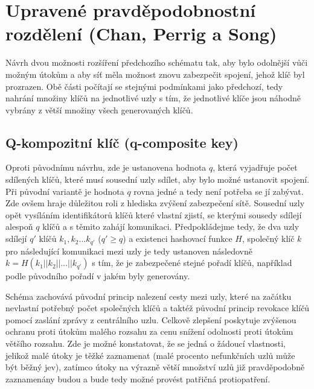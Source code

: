 \documentclass[11pt,final,twoside]{fithesis2}
\begin{document}
\section{Upravené pravděpodobnostní rozdělení (Chan, Perrig a Song)} \label{sec:Chan}
Návrh dvou možnosti rozšíření \cite{Perrig2003} předchozího schématu \cite{Eschenauer2002} tak, aby bylo odolnější vůči možným útokům a aby síť měla možnost znovu zabezpečit spojení, jehož
klíč byl prozrazen. Obě části počítají se stejnými podmínkami jako předchozí, tedy nahrání množiny klíčů na jednotlivé uzly s tím, že jednotlivé klíče jsou náhodně vybrány 
z větší množiny všech generovaných klíčů.

\subsection{Q-kompozitní klíč (q-composite key)}
Oproti původnímu návrhu, zde je ustanovena hodnota $q$, která vyjadřuje počet sdílených klíčů, které musí sousední uzly sdílet, aby bylo možné ustanovit spojení. Při původní variantě 
je hodnota $q$ rovna jedné a tedy není potřeba se jí zabývat. Zde ovšem hraje důležitou roli z hlediska zvýšení zabezpečení sítě. Sousední uzly opět vysíláním identifikátorů klíčů které vlastní
zjistí, se kterými sousedy sdílejí alespoň $q$ klíčů a s těmito zahájí komunikaci. Předpokládejme tedy, že dva uzly sdílejí $q'$ klíčů $k_1, k_2 \dots k_{q'}$ ($q' \ge q$) a existenci hashovací funkce $H$, 
společný klíč $k$ pro následující komunikaci mezi uzly je tedy ustanoven následovně $k=H(k_1 || k_2 || \dots || k_{q'})$ s tím, že je zabezpečené stejné pořadí klíčů, například podle původního
pořadí v jakém byly generovány. 

Schéma zachovává původní princip nalezení cesty mezi uzly, které na začátku nevlastní potřebný počet společných klíčů a taktéž původní princip revokace klíčů pomocí zaslání zprávy z 
centrálního uzlu. Celkově zlepšení poskytuje zvýšenou ochranu proti útokům malého rozsahu za cenu snížení odolnosti proti útokům většího rozsahu. Zde je možné konstatovat, že se jedná 
o žádoucí vlastnosti, jelikož malé útoky je těžké zaznamenat (malé procento nefunkčních uzlů může být běžný jev), zatímco útoky na výrazně větší množství uzlů již pravděpodobně zaznamenány budou a 
bude tedy možné provést patřičná protiopatření. 
\end{document}
